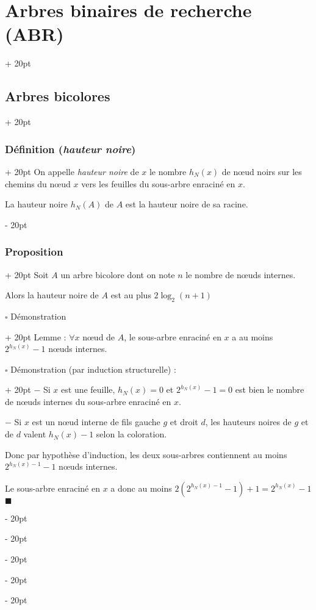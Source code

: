 \documentclass[a4paper, 12pt, twoside]{article}
\newcommand{\lr}[1]{\left( #1 \right)}
\newcommand{\ind}[1][20pt]{\advance\leftskip + #1}
\newcommand{\deind}[1][20pt]{\advance\leftskip - #1}
\newenvironment{indt}[2][20pt]{#2 \par \ind[#1]}{\par \deind} %
\begin{document}
\begin{indt}{\section{Arbres binaires de recherche (ABR)}}
\begin{indt}{\subsection{Arbres bicolores}}
\begin{indt}{\subsubsection{Définition (\textit{hauteur noire})}}
                On appelle \textit{hauteur noire} de $x$ le nombre $h_N(x)$ de n\oe ud noirs sur les chemins du n\oe ud $x$ vers les feuilles du sous-arbre enraciné en $x$.
                
                La hauteur noire $h_N(A)$ de $A$ est la hauteur noire de sa racine.
            \end{indt}
            
            \vspace{12pt}
            
            \begin{indt}{\subsubsection{Proposition}}
                Soit $A$ un arbre bicolore dont on note $n$ le nombre de n\oe uds internes.
                
                Alors la hauteur noire de $A$ est au plus $2\log_2(n + 1)$
                
                \vspace{6pt}
                
                \begin{indt}{$\square$ Démonstration}
                    Lemme : $\forall x$ n\oe ud de $A$, le sous-arbre enraciné en $x$ a au moins $2^{h_N(x)} - 1$ n\oe uds internes.
                    
                    \begin{indt}{$\square$ Démonstration (par induction structurelle) :}
                        $-$ Si $x$ est une feuille, $h_N(x) = 0$ et $2^{h_N(x)} - 1 = 0$ est bien le nombre de n\oe uds internes du sous-arbre enraciné en $x$.
                        
                        $-$ Si $x$ est un n\oe ud interne de fils gauche $g$ et droit $d$, les hauteurs noires de $g$ et de $d$ valent $h_N(x) - 1$ selon la coloration.
                        
                        Donc par hypothèse d'induction, les deux sous-arbres contiennent au moins $2^{h_N(x) - 1} - 1$ n\oe uds internes.
                        
                        Le sous-arbre enraciné en $x$ a donc au moins $2\lr{2^{h_N(x) - 1} - 1} + 1 = 2^{h_N(x)} - 1$ $\blacksquare$
                    \end{indt}
                    
                    \vspace{12pt}
                    

\end{indt}
\end{indt}
\end{indt}
\end{indt}
\end{document}
